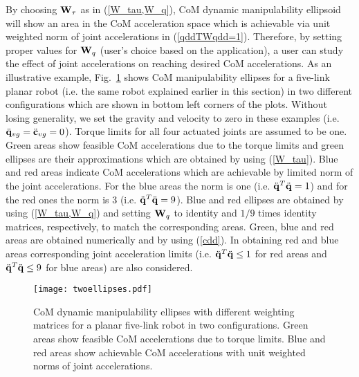 By choosing $\mathbf{W}_\tau$ as in (\ref{W_tau,W_q}), CoM dynamic manipulability
ellipsoid will show an area in the CoM acceleration space which is achievable
via unit weighted norm of joint accelerations in (\ref{qddTWqdd=1}).
Therefore, by setting proper values for $\mathbf{W}_q$ (user's choice based on the
application), a user can study the effect of joint accelerations on reaching
desired CoM accelerations.  As an illustrative example,
Fig.~\ref{two_ellipses} shows CoM manipulability ellipses for a five-link
planar robot (i.e. the same robot explained earlier in this section) in two
different configurations which are shown in bottom left corners of the plots.
Without losing generality, we set the gravity and velocity to zero in these
examples (i.e. $\ddot{\mathbf{q}}_{vg} = \ddot{\mathbf{c}}_{vg} = 0$).  Torque limits for
all four actuated joints are assumed to be one.  Green areas show feasible CoM
accelerations due to the torque limits and green ellipses are their
approximations which are obtained by using (\ref{W_tau}).  Blue and red areas
indicate CoM accelerations which are achievable by limited norm of the joint
accelerations.  For the blue areas the norm is one (i.e. $\ddot{\mathbf{q}}^T
\ddot{\mathbf{q}} = 1$) and for the red ones the norm is $3$ (i.e. $\ddot{\mathbf{q}}^T
\ddot{\mathbf{q}} = 9$).  Blue and red ellipses are obtained by using
(\ref{W_tau,W_q}) and setting $\mathbf{W}_q$ to identity and $1/9$ times identity
matrices, respectively, to match the corresponding areas.  Green, blue and red
areas are obtained numerically and by using (\ref{cdd}).  In obtaining red and
blue areas corresponding joint acceleration limits (i.e. $\ddot{\mathbf{q}}^T
\ddot{\mathbf{q}} \leq 1$ for red areas and $\ddot{\mathbf{q}}^T \ddot{\mathbf{q}} \leq 9$ for blue
areas) are also considered.
%
\begin{figure}
	\centering
	\texttt{[image: twoellipses.pdf]}
	\caption{CoM dynamic manipulability ellipses with different weighting
		matrices for a planar five-link robot in two configurations.  Green areas
		show feasible CoM accelerations due to torque limits.  Blue and red areas
		show achievable CoM accelerations with unit weighted norms of joint
		accelerations.}
	\label{two_ellipses}
\end{figure}
%

